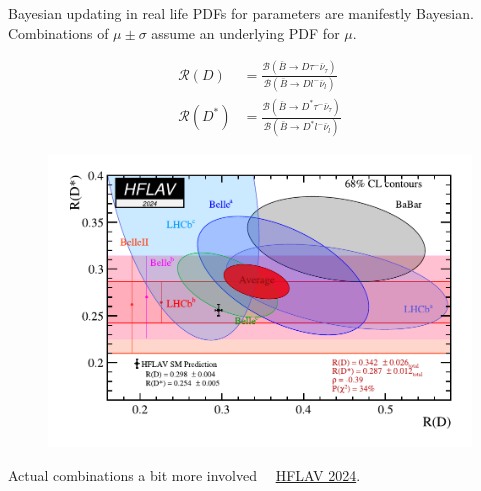 \documentclass[
aspectratio=169,
14pt,
professionalfonts
]{beamer}
\newcommand{\arrow}{~\ding{220}~}
\begin{document}
\begin{frame}{Bayesian updating in real life}
        \vspace{-0.5cm}
        PDFs for parameters are manifestly Bayesian.\\
        Combinations of $\mu \pm \sigma$ assume an underlying PDF for $\mu$.
        \begin{minipage}{0.44\textwidth}
            \begin{align*}
                \mathcal{R}(D) &= \frac{
                    \mathcal{B}(\bar B \to D \tau^- \bar{\nu}_\tau)
                }{
                    \mathcal{B}(\bar B \to D l^- \bar{\nu}_l)
                }\\
                \mathcal{R}(D^*) &= \frac{
                    \mathcal{B}(\bar B \to D^* \tau^- \bar{\nu}_\tau)
                }{
                    \mathcal{B}(\bar B \to D^* l^- \bar{\nu}_l)
                }
            \end{align*}
        \end{minipage}
        \begin{minipage}{0.55\textwidth}
            \begin{figure}
                \centering
                \includegraphics[width=\textwidth]{../plots/rd_rdstar.pdf}
            \end{figure}
        \end{minipage}
        \small Actual combinations a bit more involved \arrow \href{https://arxiv.org/pdf/2411.18639}{HFLAV 2024}.
\end{frame}
\end{document}
